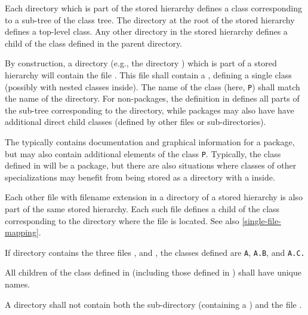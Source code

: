 Each directory which is part of the stored hierarchy defines a class corresponding to a sub-tree of the class tree.
The directory at the root of the stored hierarchy defines a top-level class.
Any other directory in the stored hierarchy defines a child of the class defined in the parent directory.

By construction, a directory (e.g., the directory ) which is part of a stored hierarchy will contain the file .
This file shall contain a , defining a single class (possibly with nested classes inside).
The name of the class (here, \lstinline!P!) shall match the name of the directory.
For non-packages, the definition in  defines all parts of the sub-tree corresponding to the directory, while packages may also have have additional direct child classes (defined by other files or sub-directories).

\begin{nonnormative}
The  typically contains documentation and graphical information for a package, but may also contain additional elements of the class \lstinline!P!.
Typically, the class defined in  will be a package, but there are also situations where classes of other specializations may benefit from being stored as a directory with a  inside.
\end{nonnormative}

Each other file with filename extension  in a directory of a stored hierarchy is also part of the same stored hierarchy.
Each such file defines a child of the class corresponding to the directory where the file is located.
See also \cref{single-file-mapping}.

\begin{example}
If directory  contains the three files ,  and , the classes defined are \lstinline!A!, \lstinline!A.B!, and \lstinline!A.C.!
\end{example}

All children of the class defined in  (including those defined in ) shall have unique names.

\begin{example}
A directory shall not contain both the sub-directory  (containing a ) and the file .
\end{example}

